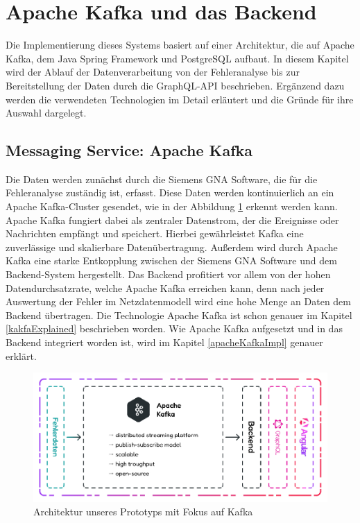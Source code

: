 \section{Apache Kafka und das Backend}
\label{chp:architecture_backend}

Die Implementierung dieses Systems basiert auf einer Architektur, die auf Apache Kafka, dem Java Spring Framework und PostgreSQL aufbaut. In diesem Kapitel wird der Ablauf der Datenverarbeitung von der Fehleranalyse bis zur Bereitstellung der Daten durch die GraphQL-API beschrieben. Ergänzend dazu werden die verwendeten Technologien im Detail erläutert und die Gründe für ihre Auswahl dargelegt.

\subsection{Messaging Service: Apache Kafka}

Die Daten werden zunächst durch die Siemens GNA Software, die für die Fehleranalyse zuständig ist, erfasst. Diese Daten werden kontinuierlich an ein Apache Kafka-Cluster gesendet, wie in der Abbildung \ref{fig:KafkaArchitektur} erkennt werden kann. Apache Kafka fungiert dabei als zentraler Datenstrom, der die Ereignisse oder Nachrichten empfängt und speichert. Hierbei gewährleistet Kafka eine zuverlässige und skalierbare Datenübertragung. Außerdem wird durch Apache Kafka eine starke Entkopplung zwischen der Siemens GNA Software und dem Backend-System hergestellt. Das Backend profitiert vor allem von der hohen Datendurchsatzrate, welche Apache Kafka erreichen kann, denn nach jeder Auswertung der Fehler im Netzdatenmodell wird eine hohe Menge an Daten dem Backend übertragen. Die Technologie Apache Kafka ist schon genauer im Kapitel \ref{kakfaExplained} beschrieben worden. Wie Apache Kafka aufgesetzt und in das Backend integriert worden ist, wird im Kapitel \ref{apacheKafkaImpl} genauer erklärt.

\begin{figure}
    \centering
    \includegraphics[width=1\textwidth]{content/img/Architecture/Architecture_Kafka.jpg}
    \caption{Architektur unseres Prototyps mit Fokus auf Kafka}
    \label{fig:KafkaArchitektur}
\end{figure}
\FloatBarrier

